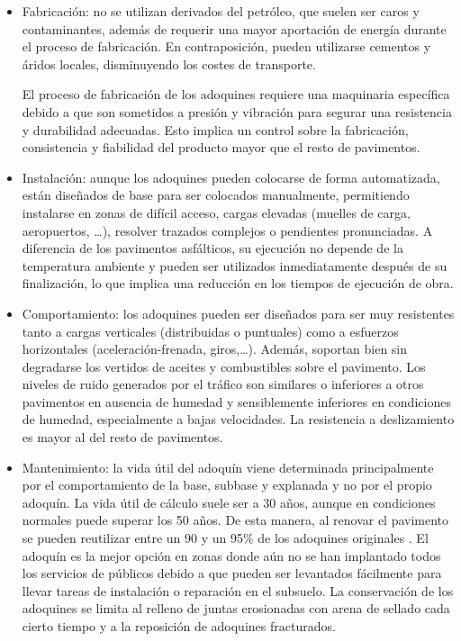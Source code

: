 \begin{itemize}
\item Fabricación: no se utilizan derivados del petróleo, que suelen ser caros y contaminantes, además de requerir una mayor aportación de energía durante el proceso de fabricación. En contraposición, pueden utilizarse cementos y áridos locales, disminuyendo los costes de transporte.

El proceso de fabricación de los adoquines requiere una maquinaria específica debido a que son sometidos a presión y vibración para segurar una resistencia y durabilidad adecuadas. Esto implica un control sobre la fabricación, consistencia y fiabilidad del producto mayor que el resto de pavimentos.

\item Instalación: aunque los adoquines pueden colocarse de forma automatizada, están diseñados de base para ser colocados manualmente, permitiendo instalarse en zonas de difícil acceso, cargas elevadas (muelles de carga, aeropuertos, \ldots), resolver trazados complejos o pendientes pronunciadas. A diferencia de los pavimentos asfálticos, su ejecución no depende de la temperatura ambiente y pueden ser utilizados inmediatamente después de su finalización, lo que implica una reducción en los tiempos de ejecución de obra.

\item Comportamiento: los adoquines pueden ser diseñados para ser muy resistentes tanto a cargas verticales (distribuidas o puntuales) como a esfuerzos horizontales (aceleración-frenada, giros,\ldots). Además, soportan bien sin degradarse los vertidos de aceites y combustibles sobre el pavimento. Los niveles de ruido generados por el tráfico son similares o inferiores a otros pavimentos en ausencia de humedad y sensiblemente inferiores en condiciones de humedad, especialmente a bajas velocidades. La resistencia a deslizamiento es mayor al del resto de pavimentos.

\item Mantenimiento: la vida útil del adoquín viene determinada principalmente por el comportamiento de la base, subbase y explanada y no por el propio adoquín. La vida útil de cálculo suele ser a 30 años, aunque en condiciones normales puede superar los 50 años. De esta manera, al renovar el pavimento se pueden reutilizar entre un 90 y un 95\% de los adoquines originales \cite{euroadoquin}. El adoquín es la mejor opción en zonas donde aún no se han implantado todos los servicios de públicos debido a que pueden ser levantados fácilmente para llevar tareas de instalación o reparación en el subsuelo. La conservación de los adoquines se limita al relleno de juntas erosionadas con arena de sellado cada cierto tiempo y a la reposición de adoquines fracturados.


\end{itemize}
